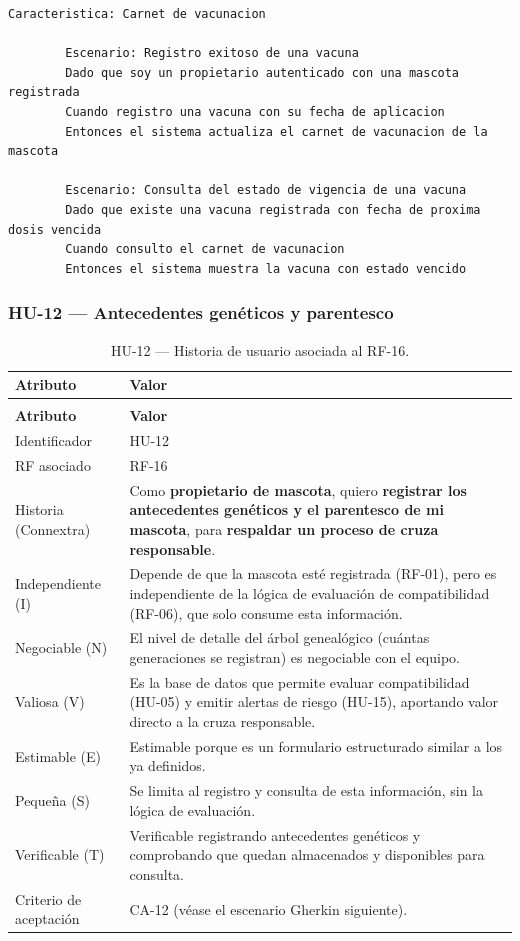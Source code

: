 \documentclass[journal,onecolumn]{IEEEtran}
\makeatletter
\newenvironment{atributos}[2]{%
	\small
	\begin{longtable}{@{}>{\raggedright\arraybackslash}p{4.2cm} >{\raggedright\arraybackslash}p{11.2cm}@{}}
		\caption{#2}\label{tab:#1}\\
		\toprule
		\textbf{Atributo} & \textbf{Valor} \\
		\midrule
		\endfirsthead
		\multicolumn{2}{@{}l}{\small\itshape (continuación)}\\
		\toprule
		\textbf{Atributo} & \textbf{Valor} \\
		\midrule
		\endhead
		\bottomrule
		\endlastfoot
	}{%
	\end{longtable}
	\normalsize
}
\makeatother
\begin{document}
	\begin{lstlisting}[style=gherkin,caption={CA-11 --- Escenario de aceptación de la historia HU-11.},label={lst:ca11}]
		Caracteristica: Carnet de vacunacion
		
		Escenario: Registro exitoso de una vacuna
		Dado que soy un propietario autenticado con una mascota registrada
		Cuando registro una vacuna con su fecha de aplicacion
		Entonces el sistema actualiza el carnet de vacunacion de la mascota
		
		Escenario: Consulta del estado de vigencia de una vacuna
		Dado que existe una vacuna registrada con fecha de proxima dosis vencida
		Cuando consulto el carnet de vacunacion
		Entonces el sistema muestra la vacuna con estado vencido
	\end{lstlisting}
	
	\subsubsection{HU-12 --- Antecedentes genéticos y parentesco}
	
	\begin{atributos}{HU-12}{HU-12 --- Historia de usuario asociada al RF-16.}
		Identificador & HU-12 \\
		RF asociado & RF-16 \\
		Historia (Connextra) & Como \textbf{propietario de mascota}, quiero \textbf{registrar los antecedentes genéticos y el parentesco de mi mascota}, para \textbf{respaldar un proceso de cruza responsable}. \\
		Independiente (I) & Depende de que la mascota esté registrada (RF-01), pero es independiente de la lógica de evaluación de compatibilidad (RF-06), que solo consume esta información. \\
		Negociable (N) & El nivel de detalle del árbol genealógico (cuántas generaciones se registran) es negociable con el equipo. \\
		Valiosa (V) & Es la base de datos que permite evaluar compatibilidad (HU-05) y emitir alertas de riesgo (HU-15), aportando valor directo a la cruza responsable. \\
		Estimable (E) & Estimable porque es un formulario estructurado similar a los ya definidos. \\
		Pequeña (S) & Se limita al registro y consulta de esta información, sin la lógica de evaluación. \\
		Verificable (T) & Verificable registrando antecedentes genéticos y comprobando que quedan almacenados y disponibles para consulta. \\
		Criterio de aceptación & CA-12 (véase el escenario Gherkin siguiente). \\
	\end{atributos}
	
\end{document}
